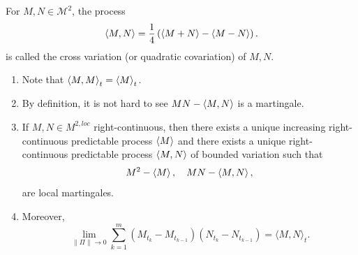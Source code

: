\begin{defn}
    For $M,N \in \mathcal{M}^2$, the process
    \begin{equation*}
    	\left\langle M,N \right\rangle = \frac{1}{4}\left(\left\langle M+N \right\rangle- \left\langle M-N \right\rangle\right).
    \end{equation*}
    is called the cross variation (or quadratic covariation) of $M,N$.
\end{defn}
\begin{rmk}
    \begin{enumerate}[label=(\roman*)]
    	\item Note that $\left\langle M,M \right\rangle_t = \left\langle M \right\rangle_t$.
    	\item By definition, it is not hard to see $MN - \left\langle M,N \right\rangle$ is a martingale.
    	\item If $M,N \in M^{2,loc}$ right-continuous, then there exists a unique increasing right-continuous predictable process $\left\langle M \right\rangle$ and there exists a unique right-continuous predictable process $\left\langle M,N \right\rangle$ of bounded variation such that
    	\begin{equation*}
    		M^2- \left\langle M \right\rangle,\quad MN - \left\langle M,N \right\rangle,
    	\end{equation*}
    	are local martingales.
    	\item Moreover,
    	\begin{equation*}
    		\lim _{\|\Pi\| \rightarrow 0} \sum_{k=1}^m\left(M_{t_k}-M_{t_{k-1}}\right)\left(N_{t_k}-N_{t_{k-1}}\right)=\langle M, N\rangle_t.
    	\end{equation*}
    \end{enumerate}
\end{rmk}

